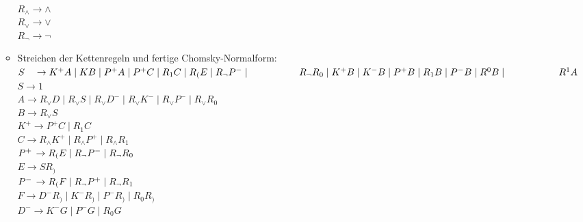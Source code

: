 \documentclass[11pt]{article}
\begin{document}
\begin{enumerate}
\begin{itemize}
\\\hspace*{6mm} $R_{\wedge} \rightarrow \wedge$
\\\hspace*{6mm} $R_{\vee} \rightarrow \vee$
\\\hspace*{6mm} $R_{\neg} \rightarrow \neg$
\item \hspace*{6mm} Streichen der Kettenregeln und fertige Chomsky-Normalform:
\\\hspace*{6mm} $S \hspace{3,5mm}\rightarrow K^{+} A\mid KB \mid P^{+}A \mid P^{+}C \mid R_{1}C \mid R_{(}E \mid R_{\neg}P^{-} \mid \hspace*{18mm} R_{\neg}R_{0} \mid K^{+}B \mid K^{-}B \mid P^{+}B \mid R_{1}B \mid P^{-}B \mid R^{0}B \mid \hspace*{19mm}R^{1}A$
\\\hspace*{6mm} $S \rightarrow 1$
\\\hspace*{6mm} $A \rightarrow R_{\vee}D \mid R_{\vee}S \mid R_{\vee}D^{-} \mid R_{\vee}K^{-} \mid R_{\vee}P^{-} \mid R_{\vee}R_{0}$
\\\hspace*{6mm} $B \rightarrow R_{\vee}S$
\\\hspace*{6mm} $K^{+} \rightarrow P^{+}C \mid R_{1}C$
\\\hspace*{6mm} $C \rightarrow R_{\wedge}K^{+} \mid R_{\wedge}P^{+} \mid R_{\wedge}R_{1}$
\\\hspace*{6mm} $P^{+} \hspace{0,5mm}\rightarrow R_{(}E\mid R_{\neg} P^{-} \mid R_{\neg}R_{0}$
\\\hspace*{6mm} $E \rightarrow SR_{)}$
\\\hspace*{6mm} $P^{-} \hspace{0,5mm}\rightarrow R_{(}F\mid R_{\neg}P^{+} \mid R_{\neg}R_{1}$
\\\hspace*{6mm} $F \rightarrow D^{-}R_{)} \mid K^{-}R_{)} \mid P^{-}R_{)} \mid R_{0}R_{)}$
\\\hspace*{6mm} $D^{-} \rightarrow K^{-}G \mid P^{-}G \mid R_{0}G$

\end{itemize}
\end{enumerate}
\end{document}
